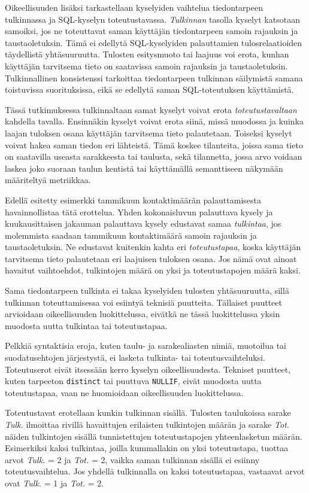 Oikeellisuuden lisäksi tarkastellaan kyselyiden vaihtelua tiedontarpeen
tulkinnassa ja SQL-kyselyn toteutustavassa. \textit{Tulkinnan} tasolla
kyselyt katsotaan samoiksi, jos ne toteuttavat saman käyttäjän
tiedontarpeen samoin rajauksin ja taustaoletuksin. Tämä ei edellytä
SQL-kyselyiden palauttamien tulosrelaatioiden täydellistä yhtäsuuruutta.
Tulosten esitysmuoto tai laajuus voi erota, kunhan käyttäjän tarvitsema
tieto on saatavissa samoin rajauksin ja taustaoletuksin.
Tulkinnallinen konsistenssi tarkoittaa tiedontarpeen tulkinnan
säilymistä samana toistuvissa suorituksissa, eikä se edellytä saman
SQL-toteutuksen käyttämistä.

Tässä tutkimuksessa tulkinnaltaan samat kyselyt voivat erota \textit{toteutustavaltaan}
kahdella tavalla. Ensinnäkin kyselyt voivat erota siinä, missä muodossa
ja kuinka laajan tuloksen osana käyttäjän tarvitsema tieto palautetaan.
Toiseksi kyselyt voivat hakea saman tiedon eri lähteistä. Tämä koskee
tilanteita, joissa sama tieto on saatavilla useasta sarakkeesta tai
taulusta, sekä tilannetta, jossa arvo voidaan laskea joko suoraan
taulun kentistä tai käyttämällä semanttiseen näkymään määriteltyä
metriikkaa.

Edellä esitetty esimerkki tammikuun kontaktimäärän palauttamisesta
havainnollistaa tätä erottelua. Yhden kokonaisluvun palauttava kysely
ja kuukausittaisen jakauman palauttava kysely edustavat samaa
\textit{tulkintaa}, jos molemmista saadaan tammikuun kontaktimäärä
samoin rajauksin ja taustaoletuksin. Ne edustavat kuitenkin kahta
eri \textit{toteutustapaa}, koska käyttäjän tarvitsema tieto
palautetaan eri laajuisen tuloksen osana. Jos nämä ovat ainoat
havaitut vaihtoehdot, tulkintojen määrä on yksi ja toteutustapojen
määrä kaksi.

Sama tiedontarpeen tulkinta ei takaa kyselyiden tulosten yhtäsuuruutta, sillä tulkinnan toteuttamisessa voi esiintyä teknisiä puutteita. Tällaiset puutteet arvioidaan oikeellisuuden luokittelussa, eivätkä ne tässä luokittelussa yksin muodosta uutta tulkintaa tai toteutustapaa.

Pelkkiä syntaktisia eroja, kuten taulu- ja sarakealiasten nimiä,
muotoilua tai suodatusehtojen järjestystä, ei lasketa tulkinta- tai
toteutusvaihteluksi. Toteutuserot eivät itsessään kerro kyselyn
oikeellisuudesta.
Tekniset puutteet, kuten tarpeeton \texttt{distinct} tai puuttuva
\texttt{NULLIF}, eivät muodosta uutta toteutustapaa, vaan ne huomioidaan
oikeellisuuden luokittelussa.

Toteutustavat erotellaan kunkin tulkinnan sisällä. Tulosten taulukoissa
sarake \textit{Tulk.} ilmoittaa rivillä havaittujen erilaisten
tulkintojen määrän ja sarake \textit{Tot.} näiden tulkintojen sisällä
tunnistettujen toteutustapojen yhteenlasketun määrän. Esimerkiksi kaksi
tulkintaa, joilla kummallakin on yksi toteutustapa, tuottaa arvot
\textit{Tulk.} = 2 ja \textit{Tot.} = 2, vaikka saman tulkinnan sisällä
ei esiinny toteutusvaihtelua. Jos yhdellä tulkinnalla on kaksi
toteutustapaa, vastaavat arvot ovat \textit{Tulk.} = 1 ja
\textit{Tot.} = 2.

